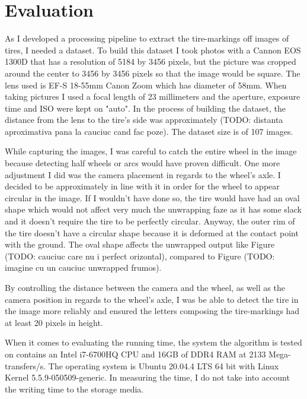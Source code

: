 \chapter{Evaluation}\pagestyle{fancy}\setlength{\parindent}{3em}
\label{chapter:evaluation}

As I developed a processing pipeline to extract the tire-markings off images of tires, I needed a dataset. To build this dataset I took photos with a Cannon EOS 1300D that has a resolution of 5184 by 3456 pixels, but the picture was cropped around the center to 3456 by 3456 pixels so that the image would be square. The lens used is EF-S 18-55mm Canon Zoom which has diameter of 58mm. When taking pictures I used a focal length of 23 millimeters and the aperture, exposure time and ISO were kept on "auto". In the process of building the dataset, the distance from the lens to the tire's side was approximately (TODO: distanta aproximativa pana la cauciuc cand fac poze). The dataset size is of 107 images.

While capturing the images, I was careful to catch the entire wheel in the image because detecting half wheels or arcs would have proven difficult. One more adjustment I did was the camera placement in regards to the wheel's axle. I decided to be approximately in line with it in order for the wheel to appear circular in the image. If I wouldn't have done so, the tire would have had an oval shape which would not affect very much the unwrapping faze as it has some slack and it doesn't require the tire to be perfectly circular. Anyway, the outer rim of the tire doesn't have a circular shape because it is deformed at the contact point with the ground. The oval shape affects the unwrapped output like Figure (TODO: cauciuc care nu i perfect orizontal), compared to Figure (TODO: imagine cu un cauciuc unwrapped frumos).

By controlling the distance between the camera and the wheel, as  well as the camera position in regards to the wheel's axle, I was be able to detect the tire in the image more reliably and ensured the letters composing the tire-markings had at least 20 pixels in height.

When it comes to evaluating the running time, the system the algorithm is tested on contains an Intel i7-6700HQ CPU and 16GB of DDR4 RAM at 2133 Mega-transfers/s. The operating system is Ubuntu 20.04.4 LTS 64 bit with Linux Kernel 5.5.9-050509-generic. In measuring the time, I do not take into account the writing time to the storage media.

